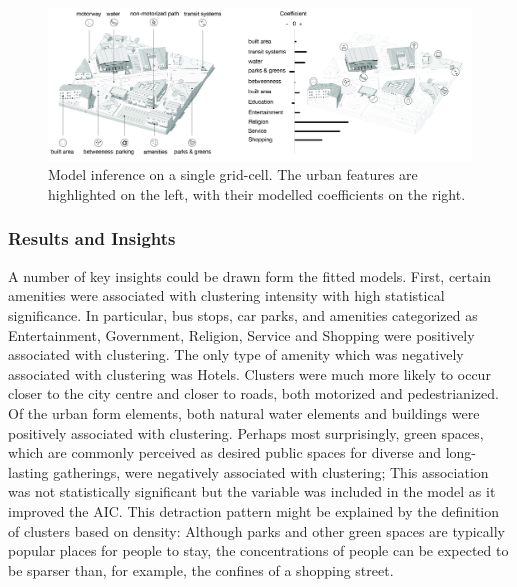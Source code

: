 {    \begin{figure}[!h]
        \begin{center}
            \includegraphics[width=1\textwidth]{chapters/insight/revurb/figures/revurb_cell_results.jpg}
        \end{center}
        \caption{Model inference on a single grid-cell. The urban features are highlighted on the left, with their modelled coefficients on the right.}
        \label{fig:revurb_cell_results}
    \end{figure}

    \subsubsection{Results and Insights}

    {
        A number of key insights could be drawn form the fitted models. First, certain amenities were associated with clustering intensity with high statistical significance. In particular, bus stops, car parks, and amenities categorized as Entertainment, Government, Religion, Service and Shopping were positively associated with clustering. The only type of amenity which was negatively associated with clustering was Hotels. Clusters were much more likely to occur closer to the city centre and closer to roads, both motorized and pedestrianized. Of the urban form elements, both natural water elements and buildings were positively associated with clustering.
        \newline
        Perhaps most surprisingly, green spaces, which are commonly perceived as desired public spaces for diverse and long-lasting gatherings, were negatively associated with clustering; This association was not statistically significant but the variable was included in the model as it improved the AIC. This detraction pattern might be explained by the definition of clusters based on density: Although parks and other green spaces are typically popular places for people to stay, the concentrations of people can be expected to be sparser than, for example, the confines of a shopping street.
    }
}

